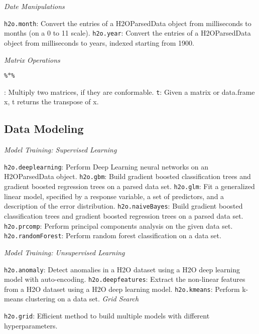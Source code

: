 {{\emph{Date Manipulations}\par
{\texttt{h2o.month}}: Convert the entries of a H2OParsedData object from milliseconds to months (on a 0 to 11 scale). \newline
{\texttt{h2o.year}}: Convert the entries of a H2OParsedData object from milliseconds to years, indexed starting from 1900.\newline

\emph{Matrix Operations}\par
{\texttt{\%$*$\%}}}: Multiply two matrices, if they are conformable.\newline
{\texttt{t}}: Given a matrix or data.frame x, t returns the transpose of x.\newline

\subsection{Data Modeling}

\emph{Model Training: Supervised Learning}\par
{\texttt{h2o.deeplearning}}: Perform Deep Learning neural networks on an H2OParsedData object.\newline
{\texttt{h2o.gbm}}: Build gradient boosted classification trees and gradient boosted regression trees on a parsed data set. \newline
{\texttt{h2o.glm}}: Fit a generalized linear model, specified by a response variable, a set of predictors, and a description of the error distribution. \newline
{\texttt{h2o.naiveBayes}}: Build gradient boosted classification trees and gradient boosted regression trees on a parsed data set.\newline
{\texttt{h2o.prcomp}}: Perform principal components analysis on the given data set. \newline
{\texttt{h2o.randomForest}}: Perform random forest classification on a data set.\newline

\emph{Model Training: Unsupervised Learning}\par
{\texttt{h2o.anomaly}}: Detect anomalies in a H2O dataset using a H2O deep learning model with auto-encoding.\newline
{\texttt{h2o.deepfeatures}}: Extract the non-linear features from a H2O dataset using a H2O deep learning model.\newline
{\texttt{h2o.kmeans}}: Perform k-means clustering on a data set. \newline
\emph{Grid Search}\par
{\texttt{h2o.grid}}: Efficient method to build multiple models with different hyperparameters. \newline

}
